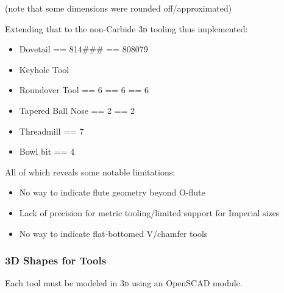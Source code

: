 \documentclass{ltxdoc}
\begin{document}
(note that some dimensions were rounded off/approximated)

Extending that to the non-Carbide \textsc{3d} tooling thus implemented:

\begin{itemize}
\item Dovetail
 == 814\#\#\#
 == 808079

\item Keyhole Tool

\item Roundover Tool
 == 6
 == 6
 == 6

\item Tapered Ball Nose
 == 2
 == 2

\item Threadmill
 == 7

\item Bowl bit
 == 4

\end{itemize}

All of which reveals some notable limitations:

\begin{itemize}
\item No way to indicate flute geometry beyond O-flute
\item Lack of precision for metric tooling/limited support for Imperial sizes
\item No way to indicate flat-bottomed V/chamfer tools 
\end{itemize}

\subsubsection{3D Shapes for Tools}

Each tool must be modeled in \textsc{3d} using an OpenSCAD module. 
\end{document}
